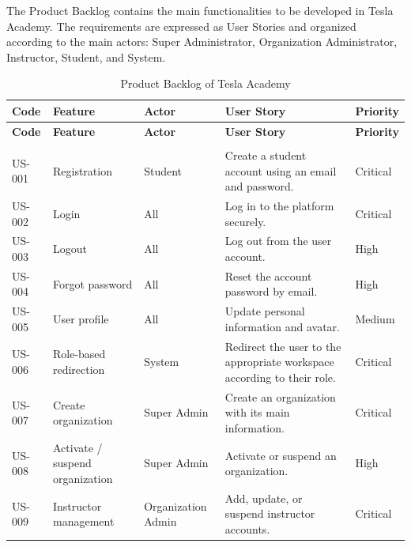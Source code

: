 The Product Backlog contains the main functionalities to be developed in Tesla Academy.
The requirements are expressed as User Stories and organized according to the main actors:
Super Administrator, Organization Administrator, Instructor, Student, and System.

\begingroup
\footnotesize
\setlength{\tabcolsep}{4pt}
\renewcommand{\arraystretch}{1.18}
\begin{longtable}{|p{1.3cm}|p{3cm}|p{2.4cm}|p{7.2cm}|p{1.7cm}|}
  \caption{Product Backlog of Tesla Academy}
  \label{tab:backlog} \\
  \hline
  \textbf{Code} & \textbf{Feature} & \textbf{Actor} & \textbf{User Story} & \textbf{Priority} \\
  \hline
  \endfirsthead

  \hline
  \textbf{Code} & \textbf{Feature} & \textbf{Actor} & \textbf{User Story} & \textbf{Priority} \\
  \hline
  \endhead
  \hline
  \endfoot

  \multicolumn{5}{|l|}{\cellcolor{gray!15}\textbf{Sprint 1 -- Authentication and User Management}} \\
  \hline
  US-001 & Registration & Student & Create a student account using an email and password. & Critical \\
  \hline
  US-002 & Login & All & Log in to the platform securely. & Critical \\
  \hline
  US-003 & Logout & All & Log out from the user account. & High \\
  \hline
  US-004 & Forgot password & All & Reset the account password by email. & High \\
  \hline
  US-005 & User profile & All & Update personal information and avatar. & Medium \\
  \hline
  US-006 & Role-based redirection & System & Redirect the user to the appropriate workspace according to their role. & Critical \\
  \hline
  US-007 & Create organization & Super Admin & Create an organization with its main information. & Critical \\
  \hline
  US-008 & Activate / suspend organization & Super Admin & Activate or suspend an organization. & High \\
  \hline
  US-009 & Instructor management & Organization Admin & Add, update, or suspend instructor accounts. & Critical \\
  \hline


\end{longtable}
